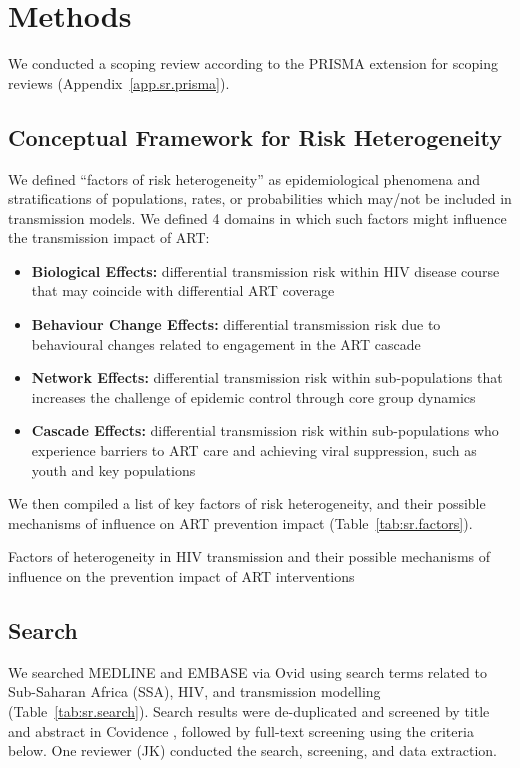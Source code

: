 \section{Methods}\label{sr.meth}
We conducted a scoping review according to the PRISMA extension for scoping reviews
(Appendix~\ref{app.sr.prisma}).
\subsection{Conceptual Framework for Risk Heterogeneity}\label{sr.meth.fw}
We defined ``factors of risk heterogeneity'' as
epidemiological phenomena and stratifications of populations, rates, or probabilities
which may/not be included in transmission models.
We defined 4 domains in which such factors might influence the transmission impact of ART:
\begin{itemize}
  \item \textbf{Biological Effects:}
  differential transmission risk within HIV disease course
  that may coincide with differential ART coverage
  \cite{Pilcher2004}
  \item \textbf{Behaviour Change Effects:}
  differential transmission risk due to
  behavioural changes related to engagement in the ART cascade
  \cite{Ramachandran2016,Tiwari2020}
  \item \textbf{Network Effects:}
  differential transmission risk within sub-populations
  that increases the challenge of epidemic control through core group dynamics
  \cite{Boily1997,Watts2010,Dodd2010}
  \item \textbf{Cascade Effects:}
  differential transmission risk within sub-populations
  who experience barriers to ART care and achieving viral suppression,
  such as youth and key populations
  \cite{Mountain2014sr,Lancaster2016,Hakim2018,Green2020}
\end{itemize}
We then compiled a list of key factors of risk heterogeneity,
and their possible mechanisms of influence on ART prevention impact (Table~\ref{tab:sr.factors}).
\begin{sidewaystable}
  \centering
  \caption{Factors of heterogeneity in HIV transmission
  and their possible mechanisms of influence on the prevention impact of ART interventions}
  \label{tab:sr.factors}
  
\end{sidewaystable}
\subsection{Search}\label{sr.meth.search}
We searched MEDLINE and EMBASE via Ovid
using search terms related to Sub-Saharan Africa (SSA), HIV, and transmission modelling
(Table~\ref{tab:sr.search}).
Search results were de-duplicated and screened by title and abstract in Covidence \cite{Covidence},
followed by full-text screening using the criteria below.
One reviewer (JK) conducted the search, screening, and data extraction.
